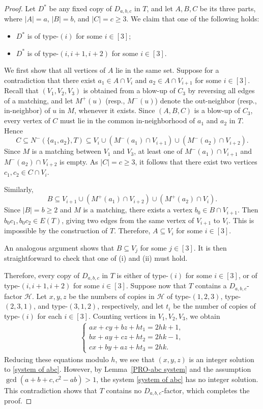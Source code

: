 \documentclass[11pt,a4paper,reqno]{amsart}
\theoremstyle{definition} %
\begin{document}
\begin{proof}
Let $D^\ast$ be any fixed copy of $D_{a,b,c}$ in $T$, and let $A,B,C$ be its three parts, where $|A|=a$, $|B|=b$, and $|C|=c\geqslant 3$. We claim that one of the following holds:

\begin{itemize}
    \item[(i)] $D^\ast$ is of type-$(i)$ for some $i\in[3]$;
    \item[(ii)] $D^\ast$ is of type-$(i,i+1,i+2)$ for some $i\in[3]$.
\end{itemize}

We first show that all vertices of $A$ lie in the same set. Suppose for a contradiction that there exist $a_1\in A\cap V_i$ and $a_2\in A\cap V_{i+1}$ for some $i\in[3]$. Recall that $(V_1,V_2,V_3)$ is obtained from a blow-up of $C_3$ by reversing all edges of a matching, and let $M^+(u)$ (resp., $M^-(u)$) denote the out-neighbor (resp., in-neighbor) of $u$ in $M$, whenever it exists. Since $(A,B,C)$ is a blow-up of $C_3$, every vertex of $C$ must lie in the common in-neighborhood of $a_1$ and $a_2$ in $T$. Hence
$$
C\subseteq N^-(\{a_1,a_2\},T)\subseteq V_i\cup (M^-(a_1)\cap V_{i+1})\cup (M^-(a_2)\cap V_{i+2}).
$$
Since $M$ is a matching between $V_1$ and $V_3$, at least one of $M^-(a_1)\cap V_{i+1}$ and $M^-(a_2)\cap V_{i+2}$ is empty. As $|C|=c\geqslant 3$, it follows that there exist two vertices $c_1,c_2\in C\cap V_i$.

Similarly,
$$
B\subseteq V_{i+1}\cup (M^+(a_1)\cap V_{i+2})\cup (M^+(a_2)\cap V_i).
$$
Since $|B|=b\geqslant 2$ and $M$ is a matching, there exists a vertex $b_0\in B\cap V_{i+1}$. Then $b_0c_1,b_0c_2\in E(T)$, giving two edges from the same vertex of $V_{i+1}$ to $V_i$. This is impossible by the construction of $T$. Therefore, $A\subseteq V_i$ for some $i\in[3]$.

An analogous argument shows that $B\subseteq V_j$ for some $j\in[3]$. It is then straightforward to check that one of (i) and (ii) must hold.

Therefore, every copy of $D_{a,b,c}$ in $T$ is either of type-$(i)$ for some $i\in[3]$, or of type-$(i,i+1,i+2)$ for some $i\in[3]$. Suppose now that $T$ contains a $D_{a,b,c}$-factor $\mathcal H$. Let $x,y,z$ be the numbers of copies in $\mathcal H$ of type-$(1,2,3)$, type-$(2,3,1)$, and type-$(3,1,2)$, respectively, and let $t_i$ be the number of copies of type-$(i)$ for each $i\in[3]$. Counting vertices in $V_1,V_2,V_3$, we obtain
\begin{align*}
\begin{cases}
ax+cy+bz+ht_1=2hk+1,\\
bx+ay+cz+ht_2=2hk-1,\\
cx+by+az+ht_3=2hk.
\end{cases}
\end{align*}
Reducing these equations modulo $h$, we see that $(x,y,z)$ is an integer solution to \eqref{system of abc}. However, by Lemma~\ref{PRO-abc system} and the assumption $\gcd(a+b+c,c^2-ab)> 1$, the system \eqref{system of abc} has no integer solution. This contradiction shows that $T$ contains no $D_{a,b,c}$-factor, which completes the proof.
\end{proof}
\end{document}

